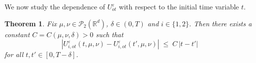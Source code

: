 \documentclass[reqno,11pt]{amsart}
\newtheorem{theorem}{Theorem}[section]
\numberwithin{equation}{section}
\newcommand{\zd}[1]{{\color{brown}[ZD:#1]}}
\newcommand{\e}{\varepsilon}
\newcommand{\nd}{\noindent}
\begin{document}


\nd
We now study the dependence of $U_{ot}^\varepsilon$ with respect to the initial time variable $t$.

\begin{theorem}\label{thm:lipschitz-time}
Fix $\mu,\nu\in\mathcal P_2(\mathbb R^d)$, $\delta\in (0,T)$ and $i\in \{1,2\}$.
Then there exists a constant $C=C(\mu,\nu,\delta)>0$ such that
\[
|U_{i,ot}^\varepsilon(t,\mu,\nu)-U_{i,ot}^\varepsilon(t',\mu,\nu)|
\;\le\;
C\,|t-t'|
\]
for all $t,t'\in[0,T-\delta]$.
\end{theorem}
\end{document}
